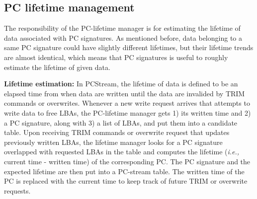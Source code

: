 

\subsection{PC lifetime management}
The responsibility of the PC-lifetime manager is for estimating the lifetime of
data associated with PC signatures. As mentioned before, data belonging
to a same PC signature could have slightly different lifetimes, but their
lifetime trends are almost identical, which  means that PC signatures is useful
to roughly estimate the lifetime of given data.

\textbf{Lifetime estimation:}
In \textsf{PCStream}, the lifetime of data is defined to be an elapsed time
from when data are written until the data are invalided by TRIM commands or
overwrites. Whenever a new write request arrives that attempts to write data to
free LBAs, the PC-lifetime manager gets 1) its written time and 2) a PC
signature, along with 3) a list of LBAs, and put them into a candidate table.
Upon receiving TRIM commands or overwrite request that updates previously
written LBAs, the lifetime manager looks for a PC signature overlapped with
requested LBAs in the table and computes the lifetime (\textit{i.e.,} current
time - written time) of the corresponding PC.  The PC signature and the
expected lifetime are then put into a PC-stream table.  The written time of the
PC is replaced with the current time to keep track of future TRIM or overwrite
requests.  

